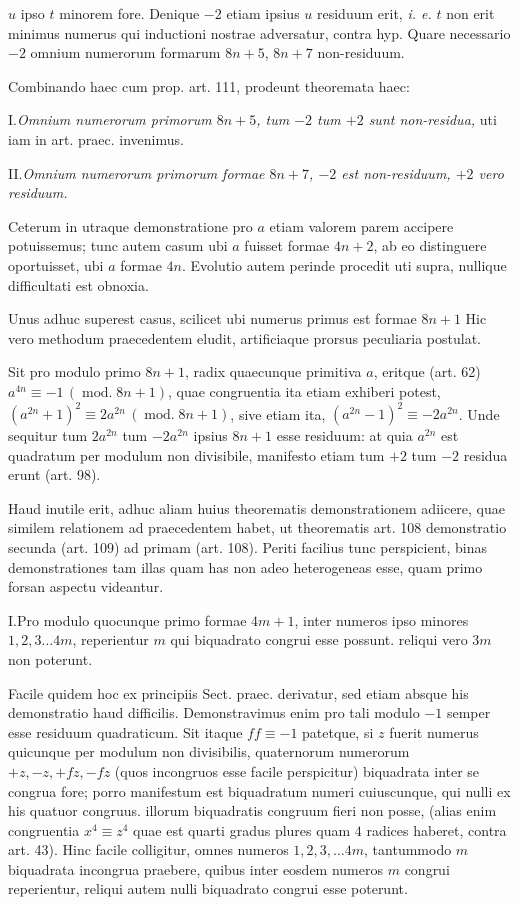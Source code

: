$u$ ipso $t$ minorem fore. Denique $-2$ etiam ipsius $u$ residuum erit, \emph{i. e.} $t$ non erit minimus numerus qui inductioni nostrae adversatur, contra hyp. Quare necessario $-2$ omnium numerorum formarum $8n+5$, $8n+7$ non-residuum.

Combinando haec cum prop. art. 111, prodeunt theoremata haec:

I.\quad \emph{Omnium numerorum primorum $8n+5$, tum $-2$ tum $+2$ sunt non-residua,} uti iam in art. praec. invenimus.

II.\quad \emph{Omnium numerorum primorum formae $8n+7$, $-2$ est non-residuum, $+2$ vero residuum.}

Ceterum in utraque demonstratione pro $a$ etiam valorem parem accipere potuissemus; tunc autem casum ubi $a$ fuisset formae $4n+2$, ab eo distinguere oportuisset, ubi $a$ formae $4n$. Evolutio autem perinde procedit uti supra, nullique difficultati est obnoxia.

Unus adhuc superest casus, scilicet ubi numerus primus est formae $8n+1$
Hic vero methodum praecedentem eludit, artificiaque prorsus peculiaria postulat.

Sit pro modulo primo $8n+1$, radix quaecunque primitiva $a$, eritque (art. 62) $a^{4n}\equiv-1\,(\operatorname{mod.}8n+1)$, quae congruentia ita etiam exhiberi potest, $(a^{2n}+1)^2\equiv2a^{2n}\,(\operatorname{mod.}8n+1)$, sive etiam ita, $(a^{2n}-1)^2\equiv-2a^{2n}$. Unde sequitur tum $2a^{2n}$ tum $-2a^{2n}$ ipsius $8n+1$ esse residuum: at quia $a^{2n}$ est quadratum per modulum non divisibile, manifesto etiam tum $+2$ tum $-2$ residua erunt (art. 98).

Haud inutile erit, adhuc aliam huius theorematis demonstrationem adiicere, quae similem relationem ad praecedentem habet, ut theorematis art. 108 demonstratio secunda (art. 109) ad primam (art. 108). Periti facilius tunc perspicient, binas demonstrationes tam illas quam has non adeo heterogeneas esse, quam primo forsan aspectu videantur.

I.\quad Pro modulo quocunque primo formae $4m+1$, inter numeros ipso minores $1,2,3\ldots4m$, reperientur $m$ qui biquadrato congrui esse possunt. reliqui vero $3m$ non poterunt.

Facile quidem hoc ex principiis Sect. praec. derivatur, sed etiam absque his demonstratio haud difficilis. Demonstravimus enim pro tali modulo $-1$ semper esse residuum quadraticum. Sit itaque $ff\equiv-1$ patetque, si $z$ fuerit numerus quicunque per modulum non divisibilis, quaternorum numerorum $+z,-z,+fz,-fz$ (quos incongruos esse facile perspicitur) biquadrata inter se congrua fore; porro manifestum est biquadratum numeri cuiuscunque, qui nulli ex his quatuor congruus. illorum biquadratis congruum fieri non posse, (alias enim congruentia $x^4\equiv z^4$ quae est quarti gradus plures quam $4$ radices haberet, contra art. 43). Hinc facile colligitur, omnes numeros $1,2,3,\ldots4m$, tantummodo $m$ biquadrata incongrua praebere, quibus inter eosdem numeros $m$ congrui reperientur, reliqui autem nulli biquadrato congrui esse poterunt.


